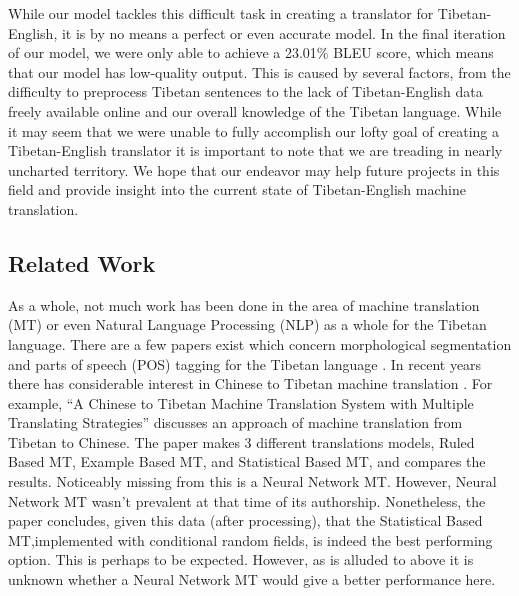 \documentclass[letterpaper, 12 pt, conference]{ieeeconf}  %
\begin{document}
While our model tackles this difficult task in creating a translator for Tibetan-English, it is by no means a perfect or even accurate model. In the final iteration of our model, we were only able to achieve a 23.01\% BLEU score, which means that our model has low-quality output. This is caused by several factors, from the difficulty to preprocess Tibetan sentences to the lack of Tibetan-English data freely available online and our overall knowledge of the Tibetan language. While it may seem that we were unable to fully accomplish our lofty goal of creating a Tibetan-English translator it is important to note that we are treading in nearly uncharted territory. We hope that our endeavor may help future projects in this field and provide insight into the current state of Tibetan-English machine translation. 


\subsection{Related Work}

As a whole, not much work has been done in the area of machine translation (MT) or even Natural Language Processing (NLP) as a whole for the Tibetan language. There are a few papers exist which concern morphological segmentation and parts of speech (POS) tagging for the Tibetan language \cite{c3} \cite{c4}. In recent years there has considerable interest in Chinese to Tibetan machine translation \cite{c1} \cite{c2}. For example, “A Chinese to Tibetan Machine Translation System with Multiple Translating Strategies” discusses an approach of machine translation from Tibetan to Chinese. The paper makes 3 different translations models, Ruled Based MT, Example Based MT, and Statistical Based MT,  and compares the results. Noticeably missing from this is a Neural Network MT. However, Neural Network MT wasn’t prevalent at that time of its authorship. Nonetheless, the paper concludes, given this data (after processing), that the Statistical Based MT,implemented with conditional random fields, is indeed the best performing option. This is perhaps to be expected. However, as is alluded to above it is unknown whether a Neural Network MT would give a better performance here.
\end{document}
